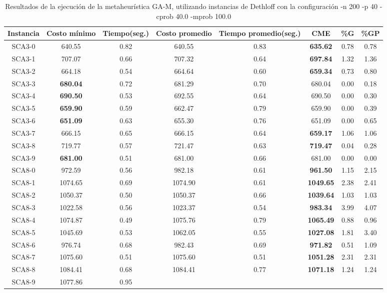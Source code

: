 \begin{table}[ht]
\caption{Resultados de la ejecución de la metaheurística GA-M, utilizando instancias de Dethloff con la configuración -n 200 -p 40 -cprob 40.0 -mprob 100.0}
\centering
\small
\begin{tabular}{c c c c c c c c}
\hline\hline
Instancia & Costo mínimo & Tiempo(seg.) & Costo promedio & Tiempo promedio(seg.) & CME & \%G & \%GP \\ [0.5ex]
\hline
SCA3-0 & 640.55 & 0.82 & 
640.55 & 0.83 & \bf{635.62} & 
0.78 & 0.78\\SCA3-1 & 707.07 & 0.66 & 
707.32 & 0.64 & \bf{697.84} & 
1.32 & 1.36\\SCA3-2 & 664.18 & 0.54 & 
664.64 & 0.60 & \bf{659.34} & 
0.73 & 0.80\\SCA3-3 & \bf{680.04} & 0.72 & 
681.29 & 0.70 & 680.04 & 0.00
 & 0.18\\SCA3-4 & \bf{690.50} & 0.53 & 
692.55 & 0.64 & 690.50 & 0.00
 & 0.30\\SCA3-5 & \bf{659.90} & 0.59 & 
662.47 & 0.79 & 659.90 & 0.00
 & 0.39\\SCA3-6 & \bf{651.09} & 0.63 & 
655.30 & 0.76 & 651.09 & 0.00
 & 0.65\\SCA3-7 & 666.15 & 0.65 & 
666.15 & 0.64 & \bf{659.17} & 
1.06 & 1.06\\SCA3-8 & 719.77 & 0.57 & 
721.47 & 0.63 & \bf{719.47} & 
0.04 & 0.28\\SCA3-9 & \bf{681.00} & 0.51 & 
681.00 & 0.66 & 681.00 & 0.00
 & 0.00\\
SCA8-0 & 972.59 & 0.56 & 
982.18 & 0.61 & \bf{961.50} & 
1.15 & 2.15\\SCA8-1 & 1074.65 & 0.69 & 
1074.90 & 0.61 & \bf{1049.65} & 
2.38 & 2.41\\SCA8-2 & 1050.37 & 0.50 & 
1050.37 & 0.66 & \bf{1039.64} & 
1.03 & 1.03\\SCA8-3 & 1022.58 & 0.56 & 
1023.37 & 0.54 & \bf{983.34} & 
3.99 & 4.07\\SCA8-4 & 1074.87 & 0.49 & 
1075.76 & 0.79 & \bf{1065.49} & 
0.88 & 0.96\\SCA8-5 & 1045.69 & 0.53 & 
1062.05 & 0.55 & \bf{1027.08} & 
1.81 & 3.40\\SCA8-6 & 976.74 & 0.68 & 
982.43 & 0.69 & \bf{971.82} & 
0.51 & 1.09\\SCA8-7 & 1075.60 & 0.51 & 
1075.60 & 0.51 & \bf{1051.28} & 
2.31 & 2.31\\SCA8-8 & 1084.41 & 0.68 & 
1084.41 & 0.77 & \bf{1071.18} & 
1.24 & 1.24\\SCA8-9 & 1077.86 & 0.95 & 

\end{tabular}
\end{table}
